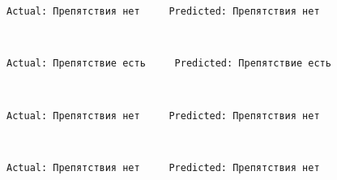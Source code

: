 \documentclass[11pt]{article}
\begin{document}
    \begin{Verbatim}[commandchars=\\\{\}]
Actual: Препятствия нет     Predicted: Препятствия нет

    \end{Verbatim}

    \begin{center}
    \end{center}
    { \hspace*{\fill} \\}
    
    \begin{Verbatim}[commandchars=\\\{\}]
Actual: Препятствие есть     Predicted: Препятствие есть

    \end{Verbatim}

    \begin{center}
    \end{center}
    { \hspace*{\fill} \\}
    
    \begin{Verbatim}[commandchars=\\\{\}]
Actual: Препятствия нет     Predicted: Препятствия нет

    \end{Verbatim}

    \begin{center}
    \end{center}
    { \hspace*{\fill} \\}
    
    \begin{Verbatim}[commandchars=\\\{\}]
Actual: Препятствия нет     Predicted: Препятствия нет

    \end{Verbatim}

    \begin{center}
    \end{center}
    { \hspace*{\fill} \\}
    
\end{document}
